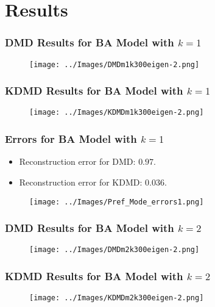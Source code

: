 \documentclass{beamer}
\begin{document}
\section{Results}
\begin{frame}
    \frametitle{DMD Results for BA Model with $k=1$}
    \begin{figure}
        \texttt{[image: ../Images/DMDm1k300eigen-2.png]}
        \centering
    \end{figure}
\end{frame}

\begin{frame}
    \frametitle{KDMD Results for BA Model with $k=1$}
    \begin{figure}
        \texttt{[image: ../Images/KDMDm1k300eigen-2.png]}
        \centering
    \end{figure}
\end{frame}

\begin{frame}
    \frametitle{Errors for BA Model with $k=1$}
    \begin{itemize}
        \item  Reconstruction error for DMD: $0.97$. 
        \item  Reconstruction error for KDMD: $0.036$.
    \end{itemize}
   
    \begin{figure}
        \texttt{[image: ../Images/Pref\_Mode\_errors1.png]}
        \centering
    \end{figure}
\end{frame}

\begin{frame}
    \frametitle{DMD Results for BA Model with $k=2$}
    \begin{figure}
        \texttt{[image: ../Images/DMDm2k300eigen-2.png]}
        \centering
    \end{figure}
\end{frame}

\begin{frame}
    \frametitle{KDMD Results for BA Model with $k=2$}
    \begin{figure}
        \texttt{[image: ../Images/KDMDm2k300eigen-2.png]}
        \centering
    \end{figure}
\end{frame}
\end{document}
